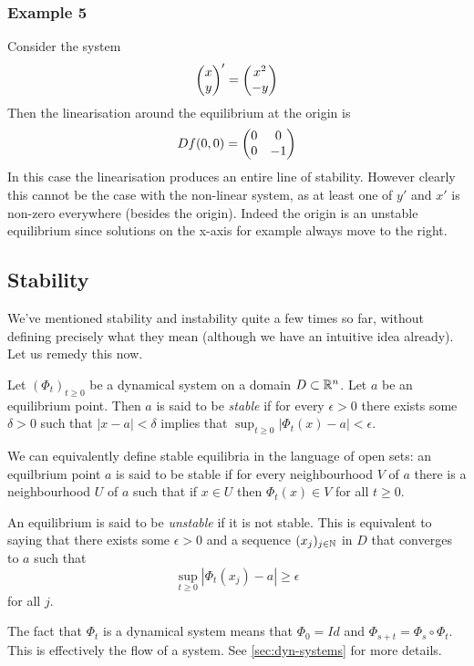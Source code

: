 \subsubsection{Example 5}
Consider the system
$$ \begin{pmatrix} x\\y \end{pmatrix}' = \begin{pmatrix} x^2\\-y \end{pmatrix} $$
Then the linearisation around the equilibrium at the origin is
$$ Df(0, 0) = \begin{pmatrix} 0 & 0\\0 & -1 \end{pmatrix} $$
In this case the linearisation produces an entire line of stability. However clearly this cannot be the case with the non-linear system, as at least one of $y'$ and $x'$ is non-zero everywhere (besides the origin). Indeed the origin is an unstable equilibrium since solutions on the x-axis for example always move to the right.

\subsection{Stability}\label{subsec:stability}
We've mentioned stability and instability quite a few times so far, without defining precisely what they mean (although we have an intuitive idea already). Let us remedy this now.
\begin{definition}
Let $(\Phi_t)_{t \geq 0}$ be a dynamical system on a domain $D \subset \mathbb{R}^n$. Let $a$ be an equilibrium point. Then $a$ is said to be \textit{stable} if for every $\epsilon > 0$ there exists some $\delta > 0$ such that $|x - a| < \delta$ implies that $\sup_{t \geq 0} \left| \Phi_t(x) - a \right| < \epsilon$.

We can equivalently define stable equilibria in the language of open sets: an equilbrium point $a$ is said to be stable if for every neighbourhood $V$ of $a$ there is a neighbourhood $U$ of $a$ such that if $x \in U$ then $\Phi_t(x) \in V$ for all $t \geq 0$.

An equilibrium is said to be \textit{unstable} if it is not stable. This is equivalent to saying that there exists some $\epsilon > 0$ and a sequence $(x_j)_{j \in \mathbb{N}}$ in $D$ that converges to $a$ such that
$$ \sup_{t \geq 0} \left| \Phi_t(x_j) - a \right| \geq \epsilon $$
for all $j$.
\end{definition}
\begin{remark}
    The fact that $\Phi_t$ is a dynamical system means that $\Phi_0 = Id$ and $\Phi_{s + t} = \Phi_s \circ \Phi_t$. This is effectively the flow of a system. See \autoref{sec:dyn-systems} for more details.
\end{remark}
